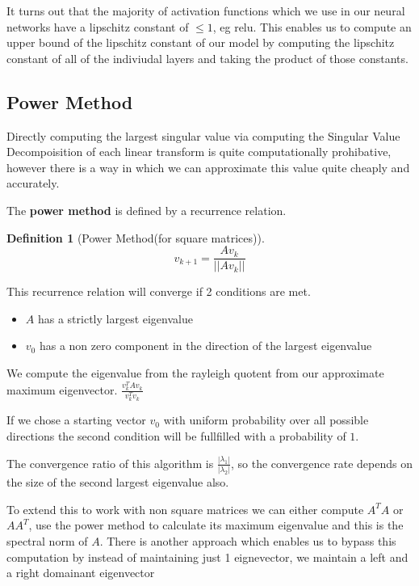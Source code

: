 \documentclass[12pt, a4paper]{report}
\theoremstyle{definition}
\newtheorem{definition}{Definition}[section]
\begin{document}
It turns out that the majority of activation functions which we use in our neural networks have a lipschitz constant of $\leq 1$, eg relu. This enables us to compute an upper bound of the lipschitz constant of our model by computing the lipschitz constant of all of the indiviudal layers and taking the product of those constants.



\subsection{Power Method}

Directly computing the largest singular value via computing the Singular Value Decompoisition of each linear transform is quite computationally prohibative, however there is a way in which we can approximate this value quite cheaply and accurately.

The \textbf{power method} is defined by a recurrence relation.

\begin{definition}[Power Method(for square matrices)]
    $$v_{k+1} = \frac{Av_k}{||Av_k||} $$
\end{definition}

This recurrence relation will converge if 2 conditions are met.

\begin{itemize}
    \item $A$ has a strictly largest eigenvalue
    \item $v_0$ has a non zero component in the direction of the largest eigenvalue
\end{itemize}

We compute the eigenvalue from the rayleigh quotent from our approximate maximum eigenvector. $\frac{v_k^T A v_k}{v_k ^ T v_k}$

If we chose a starting vector $v_0$ with uniform probability over all possible directions the second condition will be fullfilled with a probability of $1$.

The convergence ratio of this algorithm is $\frac{|\lambda_1|}{|\lambda_2|}$, so the convergence rate depends on the size of the second largest eigenvalue also.


To extend this to work with non square matrices we can either compute $A^TA$ or $AA^T$, use the power method to calculate its maximum eigenvalue and this is the spectral norm of $A$.
There is another approach which enables us to bypass this computation by instead of maintaining just 1 eignevector, we maintain a left and a right domainant eigenvector
\end{document}
